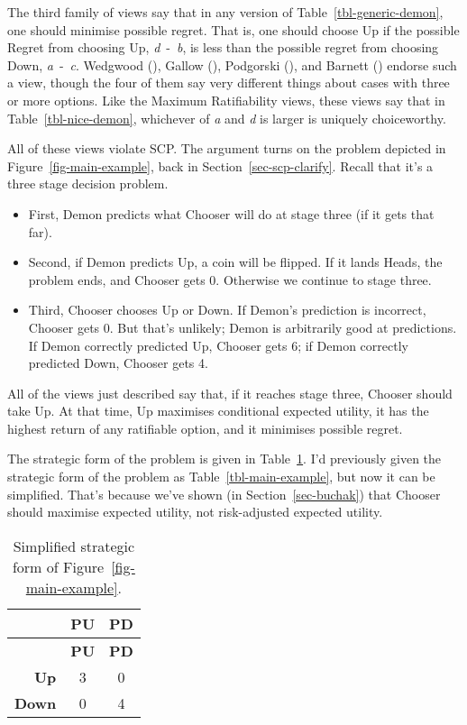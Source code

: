 \documentclass[
  11pt,
  letterpaper,
  DIV=11,
  numbers=noendperiod,
  twoside]{scrartcl}
\providecommand{\tightlist}{%
  \setlength{\itemsep}{0pt}\setlength{\parskip}{0pt}}
\begin{document}
The third family of views say that in any version of
Table~\ref{tbl-generic-demon}, one should minimise possible regret. That
is, one should choose Up if the possible Regret from choosing Up,
\emph{d}~-~\emph{b}, is less than the possible regret from choosing
Down, \emph{a}~-~\emph{c}. Wedgwood
(), Gallow
(), Podgorski
(), and Barnett
() endorse such a view, though the four
of them say very different things about cases with three or more
options. Like the Maximum Ratifiability views, these views say that in
Table~\ref{tbl-nice-demon}, whichever of \emph{a} and \emph{d} is larger
is uniquely choiceworthy.

All of these views violate SCP. The argument turns on the problem
depicted in Figure~\ref{fig-main-example}, back in
Section~\ref{sec-scp-clarify}. Recall that it's a three stage decision
problem.

\begin{itemize}
\tightlist
\item
  First, Demon predicts what Chooser will do at stage three (if it gets
  that far).
\item
  Second, if Demon predicts Up, a coin will be flipped. If it lands
  Heads, the problem ends, and Chooser gets 0. Otherwise we continue to
  stage three.
\item
  Third, Chooser chooses Up or Down. If Demon's prediction is incorrect,
  Chooser gets 0. But that's unlikely; Demon is arbitrarily good at
  predictions. If Demon correctly predicted Up, Chooser gets 6; if Demon
  correctly predicted Down, Chooser gets 4.
\end{itemize}

All of the views just described say that, if it reaches stage three,
Chooser should take Up. At that time, Up maximises conditional expected
utility, it has the highest return of any ratifiable option, and it
minimises possible regret.

The strategic form of the problem is given in
Table~\ref{tbl-main-example-simple}. I'd previously given the strategic
form of the problem as Table~\ref{tbl-main-example}, but now it can be
simplified. That's because we've shown (in Section~\ref{sec-buchak})
that Chooser should maximise expected utility, not risk-adjusted
expected utility.

\begin{longtable}[]{@{}rcc@{}}
\caption{Simplified strategic form of
Figure~\ref{fig-main-example}.}\label{tbl-main-example-simple}\tabularnewline
\toprule\noalign{}
& \textbf{PU} & \textbf{PD} \\
\midrule\noalign{}
\endfirsthead
\toprule\noalign{}
& \textbf{PU} & \textbf{PD} \\
\midrule\noalign{}
\endhead
\bottomrule\noalign{}
\endlastfoot
\textbf{Up} & 3 & 0 \\
\textbf{Down} & 0 & 4 \\
\end{longtable}
\end{document}
